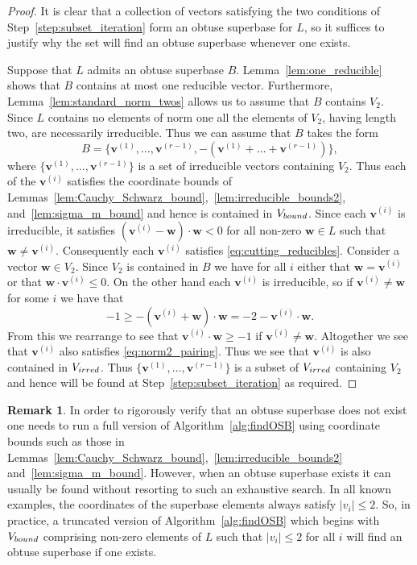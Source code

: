 \documentclass{amsart} %
\newcommand{\bv}{\bm{v}}
\theoremstyle{thm}
\theoremstyle{definition}
\newtheorem{rem}[Theorem]{Remark}
\numberwithin{equation}{section}
\begin{document}
\begin{proof}
It is clear that a collection of vectors satisfying the two conditions of Step~\ref{step:subset_iteration} form an obtuse superbase for $L$, so it suffices to justify why the set will find an obtuse superbase whenever one exists.

Suppose that $L$ admits an obtuse superbase $B$. Lemma~\ref{lem:one_reducible} shows that $B$ contains at most one reducible vector. Furthermore, Lemma~\ref{lem:standard_norm_twos} allows us to assume that $B$ contains $V_2$. Since $L$ contains no elements of norm one all the elements of $V_2$, having length two, are necessarily irreducible. Thus we can assume that $B$ takes the form
\[B=\{\bv^{(1)}, \dots, \bv^{(r-1)}, -(\bv^{(1)}+\dots + \bv^{(r-1)})\},\]
where $\{\bv^{(1)}, \dots, \bv^{(r-1)}\}$ is a set of irreducible vectors containing $V_2$. Thus each of the $\bv^{(i)}$ satisfies the coordinate bounds of Lemmas~\ref{lem:Cauchy_Schwarz_bound},~\ref{lem:irreducible_bounds2}, and~\ref{lem:sigma_m_bound} and hence is contained in $V_{\rm bound}$. Since each $\bv^{(i)}$ is irreducible, it satisfies $(\bv^{(i)}-\bm{w})\cdot \bm{w}<0$ for all non-zero $\bm{w}\in L$ such that $\bm{w}\neq \bv^{(i)}$. Consequently each $\bv^{(i)}$ satisfies \eqref{eq:cutting_reducibles}. Consider a vector $\bm{w}\in V_2$. Since $V_2$ is contained in $B$ we have for all $i$ either that $\bm{w}=\bv^{(i)}$ or that $\bm{w}\cdot \bv^{(i)}\leq 0$. On the other hand each $\bv^{(i)}$ is irreducible, so if $\bv^{(i)}\neq \bm{w}$ for some $i$ we have that
\[-1\geq-(\bv^{(i)}+\bm{w})\cdot \bm{w}=-2-\bv^{(i)}\cdot \bm{w}.\]
From this we rearrange to see that $\bv^{(i)}\cdot \bm{w}\geq -1$ if $\bv^{(i)}\neq \bm{w}$. Altogether we see that $\bv^{(i)}$ also satisfies \eqref{eq:norm2_pairing}. Thus we see that $\bv^{(i)}$ is also contained in $V_{\rm irred}$. Thus $\{\bv^{(1)}, \dots, \bv^{(r-1)}\}$ is a subset of $V_{\rm irred}$ containing $V_2$ and hence will be found at Step~\ref{step:subset_iteration} as required.
\end{proof}

\begin{rem}\label{rem:quick_OSB_search}
    In order to rigorously verify that an obtuse superbase does not exist one needs to run a full version of Algorithm~\ref{alg:findOSB} using coordinate bounds such as those in Lemmas~\ref{lem:Cauchy_Schwarz_bound},~\ref{lem:irreducible_bounds2} and~\ref{lem:sigma_m_bound}. However, when an obtuse superbase exists it can usually be found without resorting to such an exhaustive search. In all known examples, the coordinates of the superbase elements always satisfy $|v_i|\leq 2$. So, in practice, a truncated version of Algorithm~\ref{alg:findOSB} which begins with $V_{\rm bound}$ comprising non-zero elements of $L$ such that $|v_i|\leq 2$ for all $i$ will find an obtuse superbase if one exists.
\end{rem}
\end{document}
